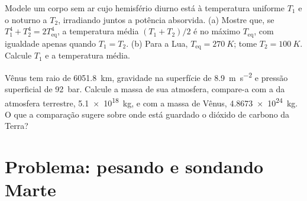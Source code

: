 \begin{exercise}[$\star\star\star$]\label{exo:b1:comparative-planetology:11}
Modele um corpo sem ar cujo hemisfério diurno está à temperatura uniforme $T_1$ e o noturno a $T_2$, irradiando juntos a potência absorvida. (a) Mostre que, se $T_1^4 + T_2^4 = 2T_\mathrm{eq}^4$, a temperatura média $(T_1 + T_2)/2$ é no máximo $T_\mathrm{eq}$, com igualdade apenas quando $T_1 = T_2$. (b) Para a Lua, $T_\mathrm{eq} = \qty{270}{K}$; tome $T_2 = \qty{100}{K}$. Calcule $T_1$ e a temperatura média.
\end{exercise}

\begin{exercise}[$\star\star\star$]\label{exo:b1:comparative-planetology:12}
Vênus tem raio de \qty{6051.8}{km}, gravidade na superfície de \qty{8.9}{m.s^{-2}} e pressão superficial de \qty{92}{bar}. Calcule a massa de sua atmosfera, compare-a com a da atmosfera terrestre, \qty{5.1e18}{kg}, e com a massa de Vênus, \qty{4.8673e24}{kg}. O que a comparação sugere sobre onde está guardado o dióxido de carbono da Terra?
\end{exercise}

\section{Problema: pesando e sondando Marte}

